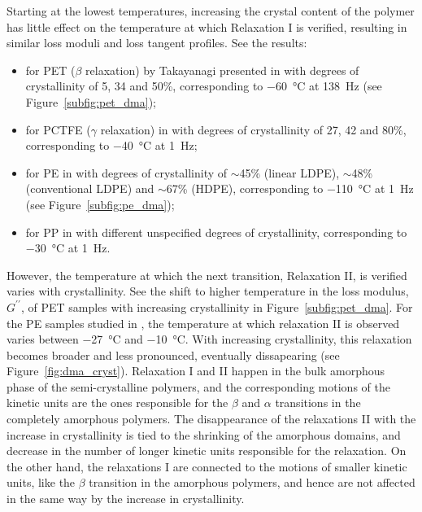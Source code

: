 Starting at the lowest temperatures, increasing the crystal content of the polymer has little effect on the temperature at which Relaxation I is verified, resulting in similar loss moduli and loss tangent profiles.
See the results:
\begin{itemize}
    \item for PET ($\beta$ relaxation) by Takayanagi presented in \cite{wardIntroductionMechanicalProperties2004} with degrees of crystallinity of 5, 34 and 50\%, corresponding to \SI{-60}{\celsius} at \SI{138}{\hertz} (see Figure~\ref{subfig:pet_dma});
    \item for PCTFE ($\gamma$ relaxation) in \cite{mccrumVariationInternalFriction1962} with degrees of crystallinity of 27, 42 and 80\%, corresponding to \SI{-40}{\celsius} at \SI{1}{\hertz};
    \item for PE in \cite{khannaDynamicMechanicalRelaxations1985} with degrees of crystallinity of $\sim$45\% (linear LDPE), $\sim$48\% (conventional LDPE) and $\sim$67\% (HDPE), corresponding to \SI{-110}{\celsius} at \SI{1}{\hertz} (see Figure~\ref{subfig:pe_dma});
    \item for PP in \cite{mccrumStudyInternalFriction1959} with different unspecified degrees of crystallinity, corresponding to \SI{-30}{\celsius} at \SI{1}{\hertz}.
\end{itemize}

However, the temperature at which the next transition, Relaxation II, is verified varies with crystallinity.
See the shift to higher temperature in the loss modulus, $G^{\prime\prime}$, of PET samples with increasing crystallinity in Figure~\ref{subfig:pet_dma}.
For the PE samples studied in \cite{khannaDynamicMechanicalRelaxations1985}, the temperature at which relaxation II is observed varies between \SI{-27}{\celsius} and \SI{-10}{\celsius}.
With increasing crystallinity, this relaxation becomes broader and less pronounced, eventually dissapearing (see Figure~\ref{fig:dma_cryst}).
Relaxation I and II happen in the bulk amorphous phase of the semi-crystalline polymers, and the corresponding motions of the kinetic units are the ones responsible for the $\beta$ and $\alpha$ transitions in the completely amorphous polymers.
The disappearance of the relaxations II with the increase in crystallinity is tied to the shrinking of the amorphous domains, and decrease in the number of longer kinetic units responsible for the relaxation.
On the other hand, the relaxations I are connected to the motions of smaller kinetic units, like the $\beta$ transition in the amorphous polymers, and hence are not affected in the same way by the increase in crystallinity.

